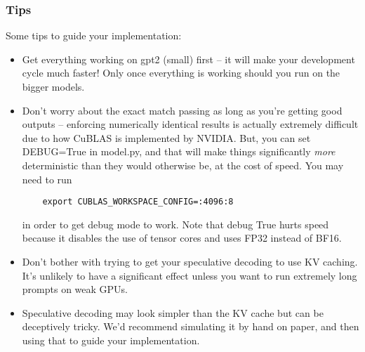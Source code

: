 \subsubsection{Tips}

Some tips to guide your implementation:
\begin{itemize}
    \item Get everything working on gpt2 (small) first -- it will make your development cycle much faster! Only once everything is working should you run on the bigger models.
    \item Don't worry about the exact match passing as long as you're getting good outputs -- enforcing numerically identical results is actually extremely difficult due to how CuBLAS is implemented by NVIDIA. But, you can set DEBUG=True in model.py, and that will make things significantly \textit{more} deterministic than they would otherwise be, at the cost of speed. You may need to run
    \begin{lstlisting}
    export CUBLAS_WORKSPACE_CONFIG=:4096:8
    \end{lstlisting}
    in order to get debug mode to work. Note that debug True hurts speed because it disables the use of tensor cores and uses FP32 instead of BF16.
    \item Don't bother with trying to get your speculative decoding to use KV caching. It's unlikely to have a significant effect unless you want to run extremely long prompts on weak GPUs.
    \item Speculative decoding may look simpler than the KV cache but can be deceptively tricky. We'd recommend simulating it by hand on paper, and then using that to guide your implementation.
\end{itemize}